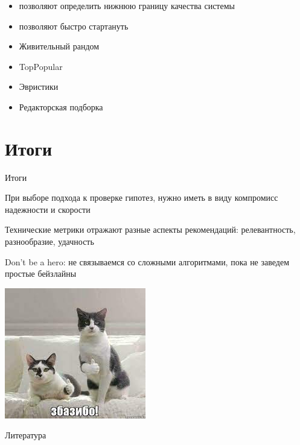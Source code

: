 \documentclass[11pt,aspectratio=169,handout]{beamer}
\begin{document}
\begin{frame}{}

\begin{tcolorbox}[colback=info!5,colframe=info!80,title=Простые бейзлайны]
\begin{itemize}
\item позволяют определить нижнюю границу качества системы
\item позволяют быстро стартануть
\end{itemize}

\end{tcolorbox}

\vfill

\begin{itemize}%
\item Живительный рандом
\item TopPopular
\item Эвристики
\item Редакторская подборка
\end{itemize}

\end{frame}

\section{Итоги}

\begin{frame}{Итоги}

\begin{tcolorbox}[colback=info!5,colframe=info!80,title=]
При выборе подхода к проверке гипотез, нужно иметь в виду компромисс надежности и скорости
\end{tcolorbox}

\begin{tcolorbox}[colback=info!5,colframe=info!80,title=]
Технические метрики отражают разные аспекты рекомендаций: релевантность, разнообразие, удачность
\end{tcolorbox}

\begin{tcolorbox}[colback=info!5,colframe=info!80,title=]
Don't be a hero: не связываемся со сложными алгоритмами, пока не заведем простые бейзлайны
\end{tcolorbox}

\end{frame}

\begin{frame}
\begin{center}
\includegraphics[scale=0.9]{images/zbazibo.jpeg}
\end{center}
\end{frame}

\begin{frame}[allowframebreaks]{Литература}




\end{frame}
\end{document}
